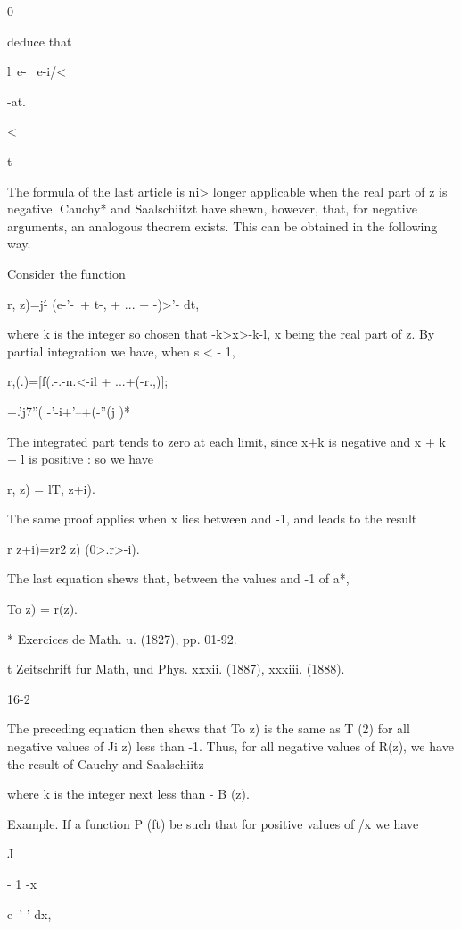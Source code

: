 0%

deduce that

l\ e- \ e-i/<

-at.

<

t


The formula of the last article is ni> longer applicable when the real
part of z is negative. Cauchy* and Saalschiitzt have shewn, however,
that, for negative arguments, an analogous theorem exists. This can be
obtained in the following way.

Consider the function

r, z)=j\'- (e-'-\ + t-, + ... + -)>'- dt,

where k is the integer so chosen that -k>x>-k-l, x being the real part
of z. By partial integration we have, when s < - 1,

r,(.)=[f(.-.-n.<-il + ...+(-r.,)];

+.'j7''( -'-i+'--+(-''(j )*

The integrated part tends to zero at each limit, since x+k is negative
and x + k + l is positive : so we have

r, z) = lT, z+i).

The same proof applies when x lies between and -1, and leads to the
result

r z+i)=zr2 z) (0>.r>-i).

The last equation shews that, between the values and -1 of a*,

To z) = r(z).

* Exercices de Math. u. (1827), pp. 01-92.

t Zeitschrift fur Math, und Phys. xxxii. (1887), xxxiii. (1888).

16-2

%
%

The preceding equation then shews that To z) is the same as T (2) for
all negative values of Ji z) less than -1. Thus, for all negative
values of R(z), we have the result of Cauchy and Saalschiitz

where k is the integer next less than - B (z).

Example. If a function P (ft) be such that for positive values of /x
we have

J

- 1 -x

e~'-' dx,

